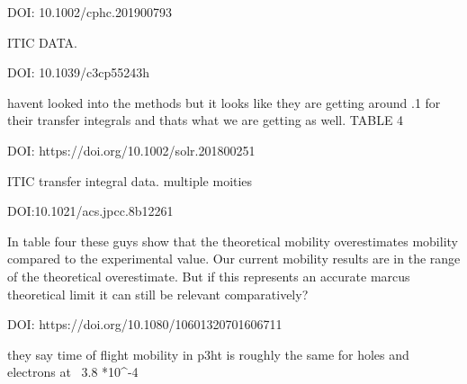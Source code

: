 DOI: 10.1002/cphc.201900793

        ITIC DATA.

DOI: 10.1039/c3cp55243h

    havent looked into the methods but it looks like they are getting around .1 for their transfer
    integrals and thats what we are getting as well.  TABLE 4


DOI: https://doi.org/10.1002/solr.201800251

    ITIC transfer integral data. multiple moities

DOI:10.1021/acs.jpcc.8b12261
 
    In table four these guys show that the theoretical mobility overestimates mobility 
    compared to the experimental value. Our current mobility results are in the range of
    the theoretical overestimate. But if this represents an accurate marcus theoretical
    limit it can still be relevant comparatively?

DOI: https://doi.org/10.1080/10601320701606711

    they say time of flight mobility in p3ht is roughly the same for holes and 
    electrons at ~3.8 *10^{-4}
